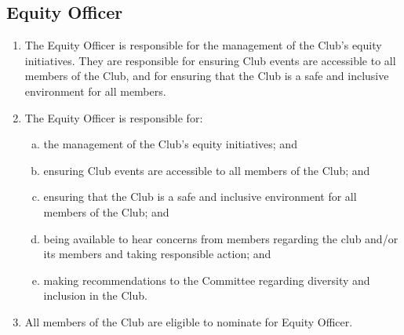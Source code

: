 \documentclass{schedule}
\begin{document}
\subsection{Equity Officer}
\begin{enumerate}[(1)]
    \item The Equity Officer is responsible for the management of the Club's equity initiatives. They are responsible for ensuring Club events are accessible to all members of the Club, and for ensuring that the Club is a safe and inclusive environment for all members.
    \item The Equity Officer is responsible for:
          \begin{enumerate}[(a)]
              \item the management of the Club's equity initiatives; and
              \item ensuring Club events are accessible to all members of the Club; and
              \item ensuring that the Club is a safe and inclusive environment for all members of the Club; and
              \item being available to hear concerns from members regarding the club and/or its members and taking responsible action; and
              \item making recommendations to the Committee regarding diversity and inclusion in the Club.
          \end{enumerate}
    \item All members of the Club are eligible to nominate for Equity Officer.
\end{enumerate}
\end{document}
